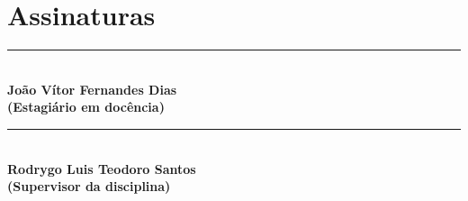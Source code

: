 \documentclass[12pt, a4paper]{article}
\begin{document}
\begin{comment}
        23 & ter. 04/11 & Projeto: Exercícios & $EX_5$ \\
        24 & qui. 06/11 & Tópicos: EDA & ~ \\
        25 & ter. 11/11 & Revisão & ~ \\
        26 & qui. 13/11 & \textbf{Prova 3:} Projeto, Tópicos & $P_3$ \\
        27 & ter. 18/11 & $TP_2$: Desenvolvimento (extraclasse) & ~ \\
        -- & qui. 20/11 & Feriado & ~ \\
        28 & ter. 25/11 & $TP_2$: Apresentação & < $TP_2$ \\
        29 & qui. 27/11 & $TP_2$: Apresentação & ~ \\
        30 & ter. 02/12 & \textbf{Prova Substitutiva} & ~ \\
        -- & qui. 04/12 & \textbf{Exame Especial} & ~ \\ \hline
    \end{tabular}
\end{table}
\end{comment}

\section{Assinaturas} \label{sec:assinaturas} %

\vspace{1.5cm}

\noindent\rule{8cm}{0.4pt}\\
\textbf{João Vítor Fernandes Dias}\\
\textbf{(Estagiário em docência)}

\vspace{1.5cm}

\noindent\rule{8cm}{0.4pt}\\
\textbf{Rodrygo Luis Teodoro Santos}\\
\textbf{(Supervisor da disciplina)}
\end{document}
